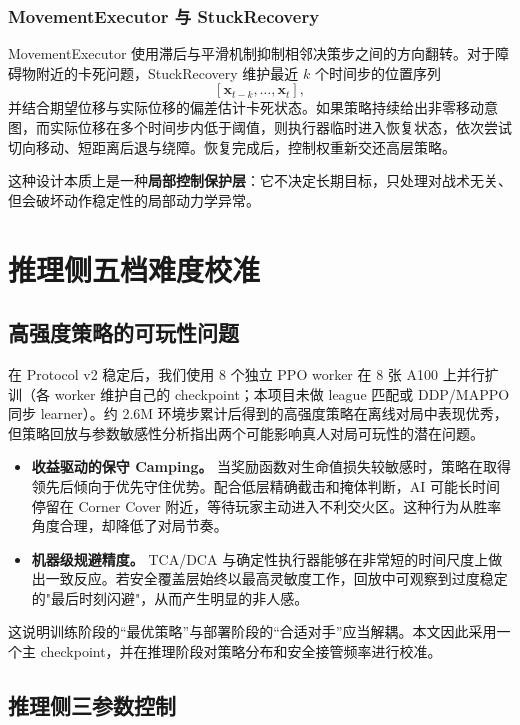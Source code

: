 \documentclass[UTF8,a4paper,11pt]{ctexart}
\begin{document}
\subsubsection{MovementExecutor 与 StuckRecovery}
MovementExecutor 使用滞后与平滑机制抑制相邻决策步之间的方向翻转。对于障碍物附近的卡死问题，StuckRecovery 维护最近 $k$ 个时间步的位置序列
\[
[\bm x_{t-k},\ldots,\bm x_t],
\]
并结合期望位移与实际位移的偏差估计卡死状态。如果策略持续给出非零移动意图，而实际位移在多个时间步内低于阈值，则执行器临时进入恢复状态，依次尝试切向移动、短距离后退与绕障。恢复完成后，控制权重新交还高层策略。

这种设计本质上是一种\textbf{局部控制保护层}：它不决定长期目标，只处理对战术无关、但会破坏动作稳定性的局部动力学异常。

\section{推理侧五档难度校准}

\subsection{高强度策略的可玩性问题}
在 Protocol v2 稳定后，我们使用 8 个独立 PPO worker 在 8 张 A100 上并行扩训（各 worker 维护自己的 checkpoint；本项目未做 league 匹配或 DDP/MAPPO 同步 learner）。约 2.6M 环境步累计后得到的高强度策略在离线对局中表现优秀，但策略回放与参数敏感性分析指出两个可能影响真人对局可玩性的潜在问题。

\begin{itemize}
    \item \textbf{收益驱动的保守 Camping。}
    当奖励函数对生命值损失较敏感时，策略在取得领先后倾向于优先守住优势。配合低层精确截击和掩体判断，AI 可能长时间停留在 Corner Cover 附近，等待玩家主动进入不利交火区。这种行为从胜率角度合理，却降低了对局节奏。

    \item \textbf{机器级规避精度。}
    TCA/DCA 与确定性执行器能够在非常短的时间尺度上做出一致反应。若安全覆盖层始终以最高灵敏度工作，回放中可观察到过度稳定的"最后时刻闪避"，从而产生明显的非人感。
\end{itemize}

这说明训练阶段的“最优策略”与部署阶段的“合适对手”应当解耦。本文因此采用一个主 checkpoint，并在推理阶段对策略分布和安全接管频率进行校准。

\subsection{推理侧三参数控制}
\end{document}
